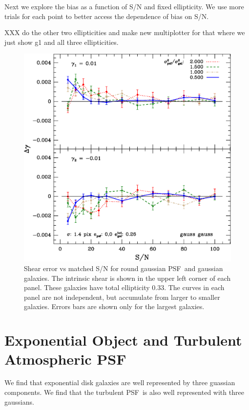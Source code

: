 \documentclass[12pt,preprint]{aastex}
\newcommand{\psf}{PSF}
\begin{document}
Next we explore the bias as a function of S/N and fixed ellipticity.    We use
more trials for each point to better access the dependence of bias on S/N.

XXX do the other two ellipticities and make new multiplotter for that
where we just show g1 and all three ellipticities.

\begin{figure}[t] \centering
\includegraphics[scale=0.7]{figures/gmix-fit-gg05r01-yr-0.005-0.005-diff.eps}

 \caption{Shear error vs matched S/N for round gaussian \psf\ and gaussian
 galaxies. The intrinsic shear is shown in the upper left corner of each panel.
 These galaxies have total ellipticity 0.33.  The curves in each panel are not
 independent, but accumulate from larger to smaller galaxies.  Errors bars are
 shown only for the largest galaxies.  \label{fig:gg05r01}}

\end{figure}


\section{Exponential Object and Turbulent Atmospheric \psf}

We find that exponential disk galaxies are well represented by three guassian
components.  We find that the turbulent \psf\ is also well represented with three
gaussians.
\end{document}
